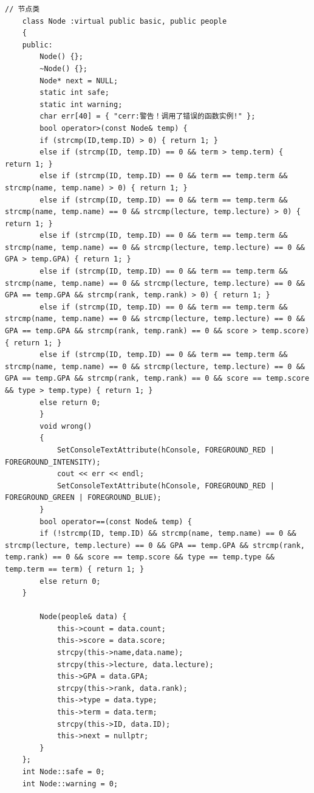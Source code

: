 \documentclass[fontset=windows]{article}
\begin{document}
\begin{lstlisting}[style = {cppstyle}]
	// 节点类
	class Node :virtual public basic, public people
	{
	public:
		Node() {};
		~Node() {};
		Node* next = NULL;
		static int safe;
		static int warning;
		char err[40] = { "cerr:警告！调用了错误的函数实例!" };
		bool operator>(const Node& temp) {
		if (strcmp(ID,temp.ID) > 0) { return 1; }
		else if (strcmp(ID, temp.ID) == 0 && term > temp.term) { return 1; }
		else if (strcmp(ID, temp.ID) == 0 && term == temp.term && strcmp(name, temp.name) > 0) { return 1; }
		else if (strcmp(ID, temp.ID) == 0 && term == temp.term && strcmp(name, temp.name) == 0 && strcmp(lecture, temp.lecture) > 0) { return 1; }
		else if (strcmp(ID, temp.ID) == 0 && term == temp.term && strcmp(name, temp.name) == 0 && strcmp(lecture, temp.lecture) == 0 && GPA > temp.GPA) { return 1; }
		else if (strcmp(ID, temp.ID) == 0 && term == temp.term && strcmp(name, temp.name) == 0 && strcmp(lecture, temp.lecture) == 0 && GPA == temp.GPA && strcmp(rank, temp.rank) > 0) { return 1; }
		else if (strcmp(ID, temp.ID) == 0 && term == temp.term && strcmp(name, temp.name) == 0 && strcmp(lecture, temp.lecture) == 0 && GPA == temp.GPA && strcmp(rank, temp.rank) == 0 && score > temp.score) { return 1; }
		else if (strcmp(ID, temp.ID) == 0 && term == temp.term && strcmp(name, temp.name) == 0 && strcmp(lecture, temp.lecture) == 0 && GPA == temp.GPA && strcmp(rank, temp.rank) == 0 && score == temp.score && type > temp.type) { return 1; }
		else return 0;
		}	
		void wrong()
		{
			SetConsoleTextAttribute(hConsole, FOREGROUND_RED | FOREGROUND_INTENSITY);
			cout << err << endl;
			SetConsoleTextAttribute(hConsole, FOREGROUND_RED | FOREGROUND_GREEN | FOREGROUND_BLUE);
		}
		bool operator==(const Node& temp) {
		if (!strcmp(ID, temp.ID) && strcmp(name, temp.name) == 0 && strcmp(lecture, temp.lecture) == 0 && GPA == temp.GPA && strcmp(rank, temp.rank) == 0 && score == temp.score && type == temp.type && temp.term == term) { return 1; }
		else return 0;
	}
	
		Node(people& data) {
			this->count = data.count;
			this->score = data.score;
			strcpy(this->name,data.name);
			strcpy(this->lecture, data.lecture);
			this->GPA = data.GPA;
			strcpy(this->rank, data.rank);
			this->type = data.type;
			this->term = data.term;
			strcpy(this->ID, data.ID);
			this->next = nullptr;
		}
	};
	int Node::safe = 0;
	int Node::warning = 0;
	
	
	
	
	

\end{lstlisting}
\end{document}
